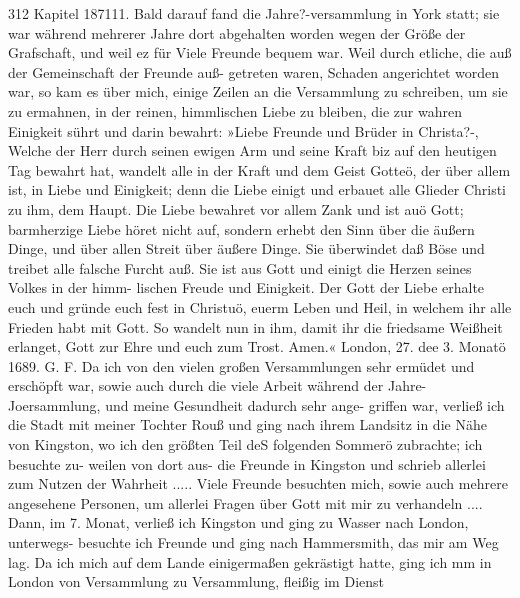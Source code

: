 312 Kapitel 187111.
Bald darauf fand die Jahre?-versammlung in York statt; sie
war während mehrerer Jahre dort abgehalten worden wegen der
Größe der Grafschaft, und weil ez für Viele Freunde bequem war.
Weil durch etliche, die auß der Gemeinschaft der Freunde auß-
getreten waren, Schaden angerichtet worden war, so kam es über
mich, einige Zeilen an die Versammlung zu schreiben, um sie zu
ermahnen, in der reinen, himmlischen Liebe zu bleiben, die zur
wahren Einigkeit sührt und darin bewahrt:
»Liebe Freunde und Brüder in Christa?-,
Welche der Herr durch seinen ewigen Arm und seine Kraft biz
auf den heutigen Tag bewahrt hat, wandelt alle in der Kraft
und dem Geist Gotteö, der über allem ist, in Liebe und Einigkeit;
denn die Liebe einigt und erbauet alle Glieder Christi zu ihm, dem
Haupt. Die Liebe bewahret vor allem Zank und ist auö Gott;
barmherzige Liebe höret nicht auf, sondern erhebt den Sinn über
die äußern Dinge, und über allen Streit über äußere Dinge.
Sie überwindet daß Böse und treibet alle falsche Furcht auß. Sie
ist aus Gott und einigt die Herzen seines Volkes in der himm-
lischen Freude und Einigkeit. Der Gott der Liebe erhalte euch
und gründe euch fest in Christuö, euerm Leben und Heil, in
welchem ihr alle Frieden habt mit Gott. So wandelt nun in
ihm, damit ihr die friedsame Weißheit erlanget, Gott zur Ehre
und euch zum Trost. Amen.«
London, 27. dee 3. Monatö 1689. G. F.
Da ich von den vielen großen Versammlungen sehr ermüdet
und erschöpft war, sowie auch durch die viele Arbeit während der
Jahre-Joersammlung, und meine Gesundheit dadurch sehr ange-
griffen war, verließ ich die Stadt mit meiner Tochter Rouß und
ging nach ihrem Landsitz in die Nähe von Kingston, wo ich den
größten Teil deS folgenden Sommerö zubrachte; ich besuchte zu-
weilen von dort aus- die Freunde in Kingston und schrieb allerlei
zum Nutzen der Wahrheit ..... Viele Freunde besuchten mich,
sowie auch mehrere angesehene Personen, um allerlei Fragen
über Gott mit mir zu verhandeln .... Dann, im 7. Monat, verließ
ich Kingston und ging zu Wasser nach London, unterwegs- besuchte
ich Freunde und ging nach Hammersmith, das mir am Weg lag.
Da ich mich auf dem Lande einigermaßen gekrästigt hatte, ging ich
mm in London von Versammlung zu Versammlung, fleißig im Dienst


